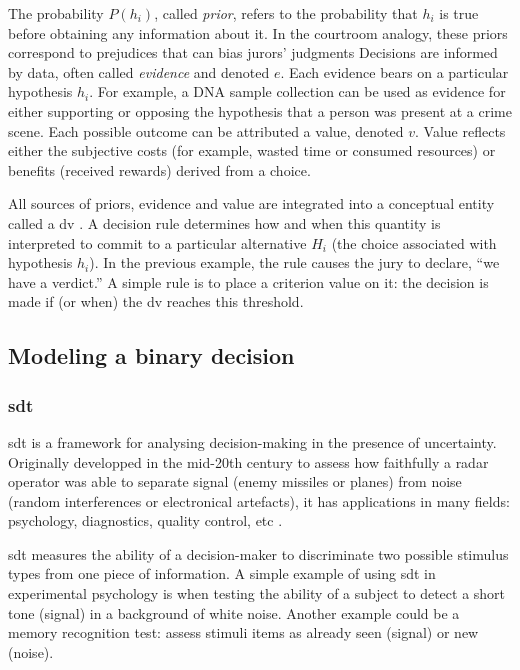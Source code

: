 The probability $P(h_i)$, called \textit{prior}, refers to the probability that $h_i$ is true before obtaining any information about it. In the courtroom analogy, these priors correspond to prejudices that can bias jurors’ judgments Decisions are informed by data, often called \textit{evidence} and denoted $e$. Each evidence bears on a particular hypothesis $h_i$. For example, a DNA sample collection can be used as evidence for either supporting or opposing the hypothesis that a person was present at a crime scene. Each possible outcome can be attributed a value, denoted $v$. Value reflects either the subjective costs (for example, wasted time or consumed resources) or benefits (received rewards) derived from a choice.

All sources of priors, evidence and value are integrated into a conceptual entity called a \acrfull{dv} \cite{goldNeuralBasisDecision2007}. A decision rule determines how and when this quantity is interpreted to commit to a particular alternative $H_i$ (the choice associated with hypothesis $h_i$). In the previous example, the rule causes the jury to declare, “we have a verdict.” A simple rule is to place a criterion value on it: the decision is made if (or when) the \acrshort{dv} reaches this threshold.

\subsection{Modeling a binary decision}

\subsubsection{\acrlong{sdt}}

\acrfull{sdt} is a framework for analysing \gls{decision-making} in the presence of uncertainty. Originally developped in the mid-20th century to assess how faithfully a radar operator was able to separate signal (enemy missiles or planes) from noise (random interferences or electronical artefacts), it has applications in many fields: psychology, diagnostics, quality control, etc \cite{green1966signal}.

\acrshort{sdt} measures the ability of a decision-maker to discriminate two possible stimulus types \cite{stanislawCalculationSignalDetection1999} from one piece of information. A simple example of using \acrshort{sdt} in experimental psychology is when testing the ability of a subject to detect a short tone (signal) in a background of white noise. Another example could be a memory recognition test: assess stimuli items as already seen (signal) or new (noise).

